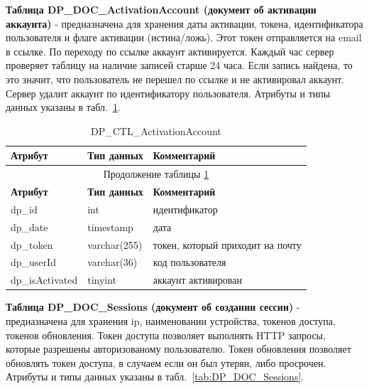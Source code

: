 \textbf{Таблица DP\_DOC\_ActivationAccount (документ об активации аккаунта)} - 
предназначена для хранения даты активации, токена, идентификатора пользователя и флаге активации (истина/ложь).
Этот токен отправляется на email в ссылке. По переходу по ссылке аккаунт активируется.
Каждый час сервер проверяет таблицу на наличие записей старше 24 часа.
Если запись найдена, то это значит, что пользователь не перешел по ссылке и не активировал аккаунт.
Сервер удалит аккаунт по идентификатору пользователя.
Атрибуты и типы данных указаны в табл.~\ref{tab:DP_DOC_ActivatedAccount}.

\begin{longtable}{|p{5.5cm}|p{3.5cm}|p{7.5cm}|}
    \caption{DP\_CTL\_ActivationAccount} \label{tab:DP_DOC_ActivatedAccount} \\
    \hline
    \textbf{Атрибут} & \textbf{Тип данных} & \textbf{Комментарий} \\ \hline
    \endfirsthead

    \multicolumn{3}{c}{Продолжение таблицы \ref{tab:DP_DOC_ActivatedAccount}} \\
    \hline
    \textbf{Атрибут} & \textbf{Тип данных} & \textbf{Комментарий} \\ \hline
    \endhead

    \endfoot

    \endlastfoot
    dp\_id & int & идентификатор \\ \hline
    dp\_date & timestamp & дата \\ \hline
    dp\_token & varchar(255) & токен, который приходит на почту \\ \hline
    dp\_userId & varchar(36) & код пользователя \\ \hline
    dp\_isActivated & tinyint & аккаунт активирован \\ \hline
\end{longtable}

\textbf{Таблица DP\_DOC\_Sessions (документ об создании сессии)} -
предназначена для хранения ip, наименовании устройства, токенов доступа, токенов обновления.
Токен доступа позволяет выполнять HTTP запросы, которые разрешены авторизованому пользователю.
Токен обновления позволяет обновлять токен доступа, в случаем если он был утерян, либо просрочен.
Атрибуты и типы данных указаны в табл.~\ref{tab:DP_DOC_Sessions}.

